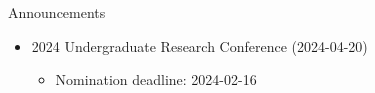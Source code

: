 \begin{frame}{Announcements}
    \begin{itemize}
        \item 2024 Undergraduate Research Conference (2024-04-20)
              \begin{itemize}
                  \item Nomination deadline: 2024-02-16
              \end{itemize}
    \end{itemize}
\end{frame}